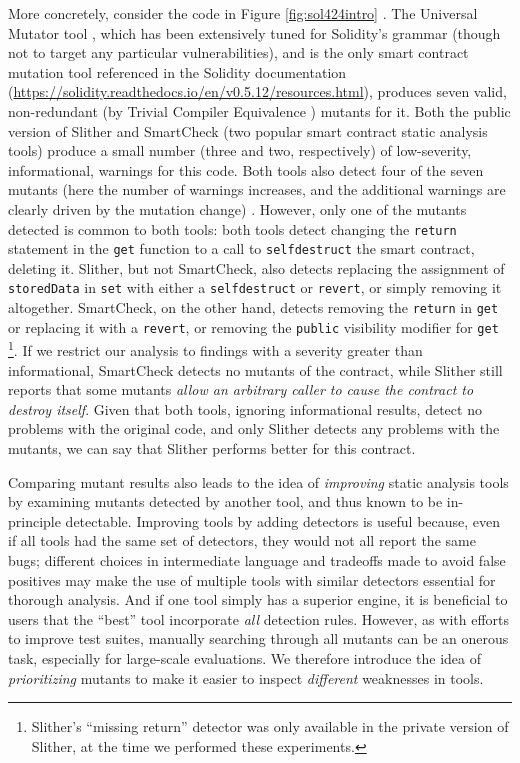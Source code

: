 More concretely, consider the code in Figure \ref{fig:sol424intro} \cite{solintro}.  The Universal Mutator tool \cite{universalmutator,regexpMut}, which has been extensively tuned for Solidity's grammar (though not to target any particular vulnerabilities), and is the only smart contract mutation tool referenced in the Solidity documentation (\url{https://solidity.readthedocs.io/en/v0.5.12/resources.html}), produces seven valid, non-redundant (by Trivial Compiler Equivalence \cite{TCE}) mutants for it.  Both the public version of Slither \cite{slither} and SmartCheck \cite{smartcheck} (two popular smart contract static analysis tools) produce a small number (three and two, respectively) of low-severity, informational, warnings for this code.  Both tools also detect four of the seven mutants (here the number of warnings increases, and the additional warnings are clearly driven by the mutation change) .  However, only one of the mutants detected is common to both tools: both tools detect changing the {\tt return} statement in the {\tt get} function to a call to {\tt selfdestruct} the smart contract, deleting it.  Slither, but not SmartCheck, also detects replacing the assignment of {\tt storedData} in {\tt set} with either a {\tt selfdestruct} or {\tt revert}, or simply removing it altogether.  SmartCheck, on the other hand, detects removing the {\tt return} in {\tt get} or replacing it with a {\tt revert}, or removing the {\tt public} visibility modifier for {\tt get} \footnote{Slither's ``missing return'' detector was only available in the private version of Slither, at the time we performed these experiments.}.  If we restrict our analysis to findings with a severity greater than informational, SmartCheck detects no mutants of the contract, while Slither still reports that some mutants \emph{allow an arbitrary caller to cause the contract to destroy itself}.  Given that both tools, ignoring informational results, detect no problems with the original code, and only Slither detects any problems with the mutants, we can say that Slither performs better for this contract.

Comparing mutant results also leads to the idea of \emph{improving} static analysis tools by examining mutants detected by another tool, and thus known to be in-principle detectable.  Improving tools by adding detectors is useful because, even if all tools had the same set of detectors, they would not all report the same bugs; different choices in intermediate language and tradeoffs made to avoid false positives may make the use of multiple tools with similar detectors essential for thorough analysis.  And if one tool simply has a superior engine, it is beneficial to users that the ``best'' tool incorporate \emph{all} detection rules.
However, as with efforts to improve test suites, manually searching through all mutants can be an onerous task, especially for large-scale evaluations.  We therefore introduce the idea of \emph{prioritizing} mutants to make it easier to inspect \emph{different} weaknesses in tools.

